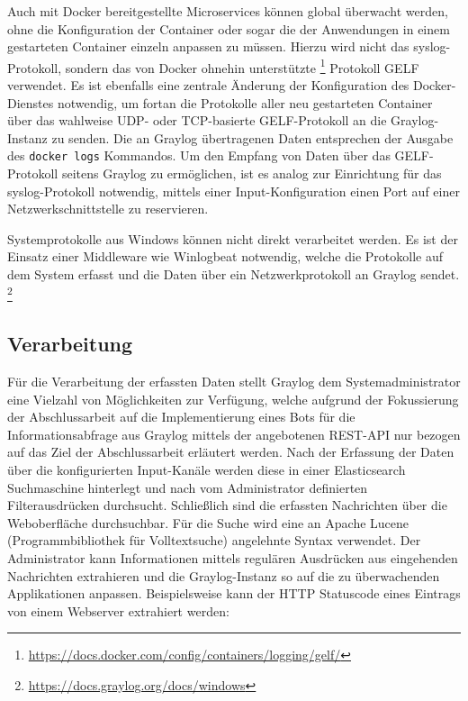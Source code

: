 Auch mit Docker bereitgestellte Microservices können global überwacht werden, ohne die Konfiguration der Container oder sogar die der Anwendungen in einem gestarteten Container einzeln anpassen zu müssen. Hierzu wird nicht das syslog-Protokoll, sondern das von Docker ohnehin unterstützte \footnote{\url{https://docs.docker.com/config/containers/logging/gelf/}} Protokoll GELF verwendet. Es ist ebenfalls eine zentrale Änderung der Konfiguration des Docker-Dienstes notwendig, um fortan die Protokolle aller neu gestarteten Container über das wahlweise UDP- oder TCP-basierte GELF-Protokoll an die Graylog-Instanz zu senden. Die an Graylog übertragenen Daten entsprechen der Ausgabe des \lstinline{docker logs} Kommandos. Um den Empfang von Daten über das GELF-Protokoll seitens Graylog zu ermöglichen, ist es analog zur Einrichtung für das syslog-Protokoll notwendig, mittels einer Input-Konfiguration einen Port auf einer Netzwerkschnittstelle zu reservieren.

Systemprotokolle aus Windows können nicht direkt verarbeitet werden. Es ist der Einsatz einer Middleware wie Winlogbeat notwendig, welche die Protokolle auf dem System erfasst und die Daten über ein Netzwerkprotokoll an Graylog sendet. \footnote{\url{https://docs.graylog.org/docs/windows}}

\subsection{Verarbeitung}

Für die Verarbeitung der erfassten Daten stellt Graylog dem Systemadministrator eine Vielzahl von Möglichkeiten zur Verfügung, welche aufgrund der Fokussierung der Abschlussarbeit auf die Implementierung eines Bots für die Informationsabfrage aus Graylog mittels der angebotenen REST-API nur bezogen auf das Ziel der Abschlussarbeit erläutert werden. Nach der Erfassung der Daten über die konfigurierten Input-Kanäle werden diese in einer Elasticsearch Suchmaschine hinterlegt und nach vom Administrator definierten Filterausdrücken durchsucht. Schließlich sind die erfassten Nachrichten über die Weboberfläche durchsuchbar. Für die Suche wird eine an Apache Lucene (Programmbibliothek für Volltextsuche) angelehnte Syntax verwendet. Der Administrator kann Informationen mittels regulären Ausdrücken aus eingehenden Nachrichten extrahieren und die Graylog-Instanz so auf die zu überwachenden Applikationen anpassen. Beispielsweise kann der HTTP Statuscode eines Eintrags von einem Webserver extrahiert werden:

